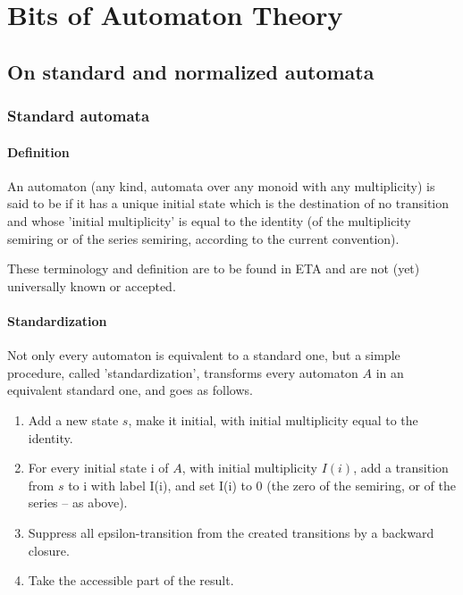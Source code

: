 \chapter{Bits of Automaton Theory}
\label{sec:theory}

\section{On standard and normalized automata}

\subsection{Standard automata}

\subsubsection{Definition}

\begin{definition}
  An automaton (any kind, automata over any monoid with any
  multiplicity) is said to be  if it has a unique
  initial state which is the destination of no transition and whose
  'initial multiplicity' is equal to the identity (of the multiplicity
  semiring or of the series semiring, according to the current
  convention).
\end{definition}

\begin{remark}
  These terminology and definition are to be found in ETA and are not
  (yet) universally known or accepted.
\end{remark}

\subsubsection{Standardization}

Not only every automaton is equivalent to a standard one, but a simple
procedure, called 'standardization', transforms every automaton $A$ in
an equivalent standard one, and goes as follows.

\begin{enumerate}
\item Add a new state $s$, make it initial, with initial multiplicity
  equal to the identity.

\item For every initial state i of $A$, with initial multiplicity
  $I(i)$, add a transition from $s$ to i with label I(i), and set I(i)
  to 0 (the zero of the semiring, or of the series -- as above).

\item\label{ite:suppress} Suppress all epsilon-transition from the
  created transitions by a backward closure.

\item\label{ite:take} Take the accessible part of the result.
\end{enumerate}


